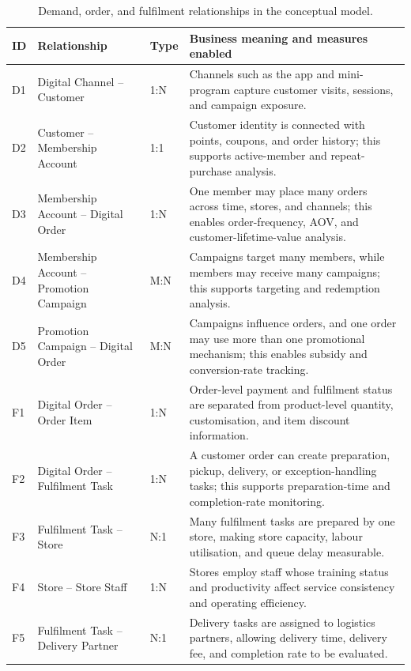 \documentclass[12pt,a4paper]{article}
\renewcommand{\arraystretch}{1.28}
\begin{document}
\begin{table}[H]
\centering
\small
\renewcommand{\arraystretch}{1.18}
\caption{Demand, order, and fulfilment relationships in the conceptual model.}
\begin{tabularx}{\textwidth}{P{1.0cm}P{4.0cm}P{1.5cm}Y}
\toprule
\textbf{ID} & \textbf{Relationship} & \textbf{Type} & \textbf{Business meaning and measures enabled} \\
\midrule
D1 & Digital Channel -- Customer & 1:N & Channels such as the app and mini-program capture customer visits, sessions, and campaign exposure. \\
D2 & Customer -- Membership Account & 1:1 & Customer identity is connected with points, coupons, and order history; this supports active-member and repeat-purchase analysis. \\
D3 & Membership Account -- Digital Order & 1:N & One member may place many orders across time, stores, and channels; this enables order-frequency, AOV, and customer-lifetime-value analysis. \\
D4 & Membership Account -- Promotion Campaign & M:N & Campaigns target many members, while members may receive many campaigns; this supports targeting and redemption analysis. \\
D5 & Promotion Campaign -- Digital Order & M:N & Campaigns influence orders, and one order may use more than one promotional mechanism; this enables subsidy and conversion-rate tracking. \\
F1 & Digital Order -- Order Item & 1:N & Order-level payment and fulfilment status are separated from product-level quantity, customisation, and item discount information. \\
F2 & Digital Order -- Fulfilment Task & 1:N & A customer order can create preparation, pickup, delivery, or exception-handling tasks; this supports preparation-time and completion-rate monitoring. \\
F3 & Fulfilment Task -- Store & N:1 & Many fulfilment tasks are prepared by one store, making store capacity, labour utilisation, and queue delay measurable. \\
F4 & Store -- Store Staff & 1:N & Stores employ staff whose training status and productivity affect service consistency and operating efficiency. \\
F5 & Fulfilment Task -- Delivery Partner & N:1 & Delivery tasks are assigned to logistics partners, allowing delivery time, delivery fee, and completion rate to be evaluated. \\
\bottomrule
\end{tabularx}
\end{table}
\end{document}
